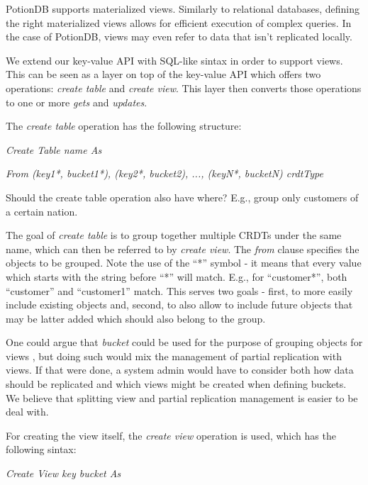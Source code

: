 \documentclass{vldb}
\newcommand{\grumbler}[2]{{\color{red}{\bf #1:} #2}}
\newcommand{\andre}[1]{\grumbler{andre}{#1}}
\newcommand{\emphvspace}{0.5\baselineskip}
\newcommand{\firstblockemph}[1]{\vspace{\emphvspace}\hspace{2em}\emph{#1}}
\newcommand{\lastblockemph}[1]{\hspace{2em}\emph{#1}\vspace{\emphvspace}}
\begin{document}
PotionDB supports materialized views.
Similarly to relational databases, defining the right materialized views allows for efficient execution of complex queries.
In the case of PotionDB, views may even refer to data that isn't replicated locally.

We extend our key-value API with SQL-like sintax in order to support views.
This can be seen as a layer on top of the key-value API which offers two operations: \emph{create table} and \emph{create view}.
This layer then converts those operations to one or more \emph{gets} and \emph{updates}.

The \emph{create table} operation has the following structure:

\firstblockemph{Create Table name As}

\lastblockemph{From (key1*, bucket1*), (key2*, bucket2), ..., (keyN*, bucketN) crdtType}

\andre{Should the create table operation also have where? E.g., group only customers of a certain nation.}

The goal of \emph{create table} is to group together multiple CRDTs under the same name, which can then be referred to by \emph{create view}.
The \emph{from} clause specifies the objects to be grouped.
Note the use of the ``*'' symbol - it means that every value which starts with the string before ``*'' will match.
E.g., for ``customer*'', both ``customer'' and ``customer1'' match.
This serves two goals - first, to more easily include existing objects and, second, to also allow to include future objects that may be latter added which should also belong to the group.

One could argue that \emph{bucket} could be used for the purpose of grouping objects for views , but doing such would mix the management of partial replication with views.
If that were done, a system admin would have to consider both how data should be replicated and which views might be created when defining buckets.
We believe that splitting view and partial replication management is easier to be deal with.

For creating the view itself, the \emph{create view} operation is used, which has the following sintax:

\firstblockemph{Create View key bucket As}
\end{document}
